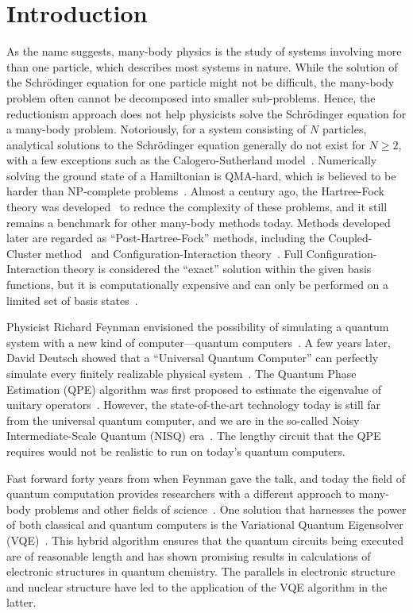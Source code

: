 \newcommand{\missingref}{\textcolor{red}{[ref]}}
\newcommand{\fakeref}[1]{\textcolor{blue}{[#1]}}
\newcommand{\comm}[1]{\textcolor{teal}{#1}}
\chapter{Introduction}

As the name suggests, many-body physics is the study of systems involving more than one particle, which describes most systems in nature. While the solution of the Schrödinger equation for one particle might not be difficult, the many-body problem often cannot be decomposed into smaller sub-problems. Hence, the reductionism approach does not help physicists solve the Schrödinger equation for a many-body problem. Notoriously, for a system consisting of  $N$  particles, analytical solutions to the Schrödinger equation generally do not exist for $ N \geq 2 $, with a few exceptions such as the Calogero-Sutherland model~\cite{Pasquier}. Numerically solving the ground state of a Hamiltonian is QMA-hard, which is believed to be harder than NP-complete problems~\cite{landau2015polynomial}. Almost a century ago, the Hartree-Fock theory was developed~\cite{BLINDER20191} to reduce the complexity of these problems, and it still remains a benchmark for other many-body methods today. Methods developed later are regarded as “Post-Hartree-Fock” methods, including the Coupled-Cluster method~\cite{Shavitt2009} and Configuration-Interaction theory~\cite{TOWNSEND201963}. Full Configuration-Interaction theory is considered the “exact” solution within the given basis functions, but it is computationally expensive and can only be performed on a limited set of basis states~\cite{TOWNSEND201963}.

Physicist Richard Feynman envisioned the possibility of simulating a quantum system with a new kind of computer—quantum computers~\cite{preskill2023}. A few years later, David Deutsch showed that a “Universal Quantum Computer” can perfectly simulate every finitely realizable physical system~\cite{deutsch1985}. The Quantum Phase Estimation (QPE) algorithm was first proposed to estimate the eigenvalue of unitary operators~\cite{Nielsen_Chuang_2010}. However, the state-of-the-art technology today is still far from the universal quantum computer, and we are in the so-called Noisy Intermediate-Scale Quantum (NISQ) era~\cite{Bharti_2022}. The lengthy circuit that the QPE requires would not be realistic to run on today's quantum computers.

Fast forward forty years from when Feynman gave the talk, and today the field of quantum computation provides researchers with a different approach to many-body problems and other fields of science~\cite{Bharti_2022}. One solution that harnesses the power of both classical and quantum computers is the Variational Quantum Eigensolver (VQE)~\cite{peruzzo2014}. This hybrid algorithm ensures that the quantum circuits being executed are of reasonable length and has shown promising results in calculations of electronic structures in quantum chemistry. The parallels in electronic structure and nuclear structure have led to the application of the VQE algorithm in the latter.

